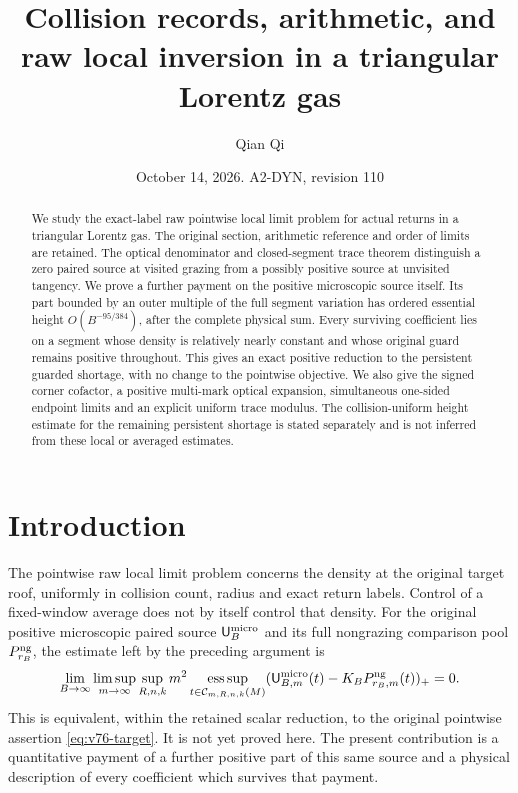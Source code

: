 \documentclass[11pt,reqno]{amsart}
\title[Collision records and raw local inversion]{Collision records, arithmetic, and raw local inversion in a triangular Lorentz gas}
\author{Qian Qi}
\date{October 14, 2026. A2-DYN, revision 110}
\numberwithin{equation}{section}
\theoremstyle{definition}\newtheorem{definition}[theorem]{Definition}
\theoremstyle{remark}\newtheorem{remark}[theorem]{Remark}
\newcommand{\esssup}{\operatorname*{ess\,sup}}
\begin{document}
\raggedbottom
\begin{abstract}
We study the exact-label raw pointwise local limit problem for actual
returns in a triangular Lorentz gas. The original section, arithmetic
reference and order of limits are retained. The optical denominator
and closed-segment trace theorem distinguish a zero paired source
at visited grazing from a possibly positive source at unvisited
tangency. We prove a further payment on the positive microscopic
source itself. Its part bounded by an outer multiple of the full
segment variation has ordered essential height $O(B^{-95/384})$,
after the complete physical sum. Every surviving coefficient lies
on a segment whose density is relatively nearly constant and whose
original guard remains positive throughout. This gives an exact
positive reduction to the persistent guarded shortage, with no
change to the pointwise objective. We also give the signed corner
cofactor, a positive multi-mark optical expansion, simultaneous
one-sided endpoint limits and an explicit uniform trace modulus.
The collision-uniform height estimate for the remaining persistent
shortage is stated separately and is not inferred from these local
or averaged estimates.
\end{abstract}
\maketitle

\section*{Introduction}
The pointwise raw local limit problem concerns the density at the
original target roof, uniformly in collision count, radius and exact
return labels. Control of a fixed-window average does not by itself
control that density. For the original positive microscopic paired
source $\mathsf U_B^{\rm micro}$ and its full nongrazing comparison
pool $P_{r_B}^{\rm ng}$, the estimate left by the preceding argument is
\begin{equation}\label{eq:v110-intro-original}
 \lim_{B\to\infty}\limsup_{m\to\infty}\sup_{R,n,k}m^2
 \esssup_{t\in\mathcal C_{m,R,n,k}(M)}
 (\mathsf U_{B,m}^{\rm micro}(t)
                      -K_BP_{r_B,m}^{\rm ng}(t))_+=0.
\end{equation}
This is equivalent, within the retained scalar reduction, to the
original pointwise assertion \eqref{eq:v76-target}. It is not yet
proved here. The present contribution is a quantitative payment of
a further positive part of this same source and a physical description
of every coefficient which survives that payment.
\end{document}
